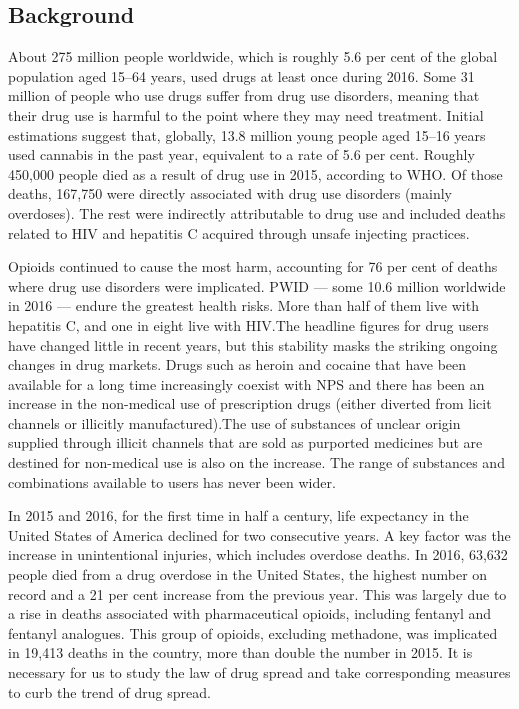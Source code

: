 \documentclass{mcmthesis}
\begin{document}
\subsection{Background}
About 275 million people worldwide, which is roughly 5.6 per cent of the global population aged 15–64 years, used drugs at least once during 2016. Some 31 million of people who use drugs suffer from drug use disorders, meaning that their drug use is harmful to the point where they may need treatment. Initial estimations suggest that, globally, 13.8 million young people aged 15–16 years used cannabis in the past year, equivalent to a rate of 5.6 per cent. 
Roughly 450,000 people died as a result of drug use in 2015, according to WHO. Of those deaths, 167,750 were directly associated with drug use disorders (mainly overdoses). The rest were indirectly attributable to drug use and included deaths related to HIV and hepatitis C acquired through unsafe injecting practices.

Opioids continued to cause the most harm, accounting for 76 per cent of deaths where drug use disorders were implicated. PWID — some 10.6 million worldwide in 2016 — endure the greatest health risks. More than half of them live with hepatitis C, and one in eight live with HIV.The headline figures for drug users have changed little in recent years, but this stability masks the striking ongoing changes in drug markets. Drugs such as heroin and cocaine that have been available for a long time increasingly coexist with NPS and there has been an increase in the non-medical use of prescription drugs (either diverted from licit channels or illicitly manufactured).The use of substances of unclear origin supplied through illicit channels that are sold as purported medicines but are destined for non-medical use is also on the increase. The range of substances and combinations available to users has never been wider. 

In 2015 and 2016, for the first time in half a century, life expectancy in the United States of America declined for two consecutive years. A key factor was the increase in unintentional injuries, which includes overdose deaths. In 2016, 63,632 people died from a drug overdose in the United States, the highest number on record and a 21 per cent increase from the previous year. This was largely due to a rise in deaths associated with pharmaceutical opioids, including fentanyl and fentanyl analogues. This group of opioids, excluding methadone, was implicated in 19,413 deaths in the country, more than double the number in 2015. It is necessary for us to study the law of drug spread and take corresponding measures to curb the trend of drug spread.\cite{1}
\end{document}
